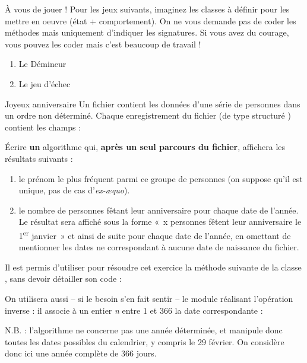 \begin{Exercice}{À vous de jouer !}
	Pour les jeux suivants, imaginez les classes à
	définir pour les mettre en oeuvre (état + comportement). On ne vous
	demande pas de coder les méthodes mais uniquement d’indiquer les
	signatures. Si vous avez du courage, vous pouvez les coder mais c’est
	beaucoup de travail !

	\begin{enumerate}[label=\alph*)]
		\item 
			Le Démineur
		\item 
			Le jeu d’échec
	\end{enumerate}
\end{Exercice}

\begin{Exercice}{Joyeux anniversaire}
	Un fichier  contient les données d’une série de personnes dans
	un ordre non déterminé. Chaque enregistrement du fichier (de type
	structuré ) contient les champs :

	
	Écrire \textbf{un} algorithme qui, \textbf{après un seul parcours du
	fichier}, affichera les résultats suivants :

	\begin{enumerate}[label=\alph*)]
		\item 
			le prénom le plus fréquent parmi ce groupe de personnes (on suppose
			qu’il est unique, pas de cas d’\textit{ex-æquo}).
		\item 
			le nombre de personnes fêtant leur anniversaire pour chaque date de
			l’année. Le résultat sera affiché sous la forme «~x personnes fêtent
			leur anniversaire le 1\textsuperscript{er} janvier~» et ainsi de suite
			pour chaque date de l’année, en omettant de mentionner les dates ne
			correspondant à aucune date de naissance du fichier.
	\end{enumerate}
	
	Il est permis d’utiliser pour résoudre cet exercice la méthode suivante
	de la classe , sans devoir détailler son code :


	On utilisera aussi – si le besoin s’en fait sentir – le module réalisant
	l’opération inverse : il associe à un entier \textit{n} entre 1 et 366
	la date correspondante :
	

	N.B. : l’algorithme ne concerne pas une année déterminée, et manipule
	donc toutes les dates possibles du calendrier, y compris le 29 février.
	On considère donc ici une année complète de 366 jours.
\end{Exercice}

